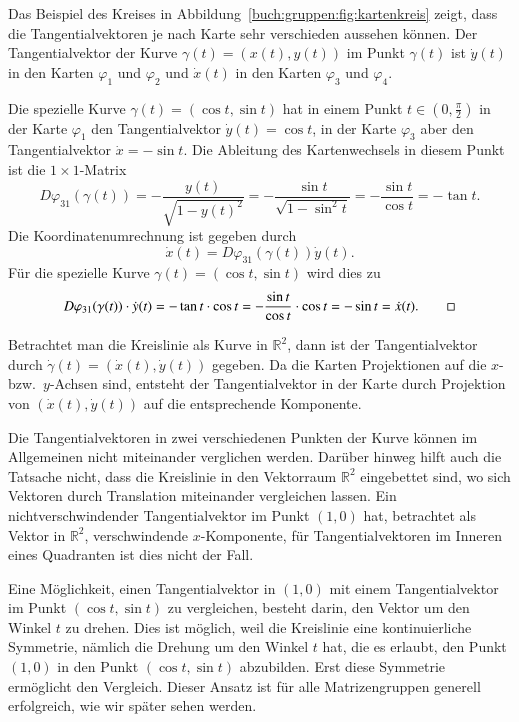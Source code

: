 \begin{beispiel}
Das Beispiel des Kreises in Abbildung~\ref{buch:gruppen:fig:kartenkreis}
zeigt, dass die Tangentialvektoren je nach Karte sehr verschieden
aussehen können.
Der Tangentialvektor der Kurve $\gamma(t) = (x(t), y(t))$ im Punkt
$\gamma(t)$ ist $\dot{y}(t)$ in den Karten $\varphi_1$ und $\varphi_2$ 
und $\dot{x}(t)$ in den Karten $\varphi_3$ und $\varphi_4$.

Die spezielle Kurve $\gamma(t) = (\cos t,\sin t)$ hat in einem Punkt
$t\in (0,\frac{\pi}2)$
in der Karte $\varphi_1$ den Tangentialvektor $\dot{y}(t)=\cos t$,
in der Karte $\varphi_3$ aber den Tangentialvektor $\dot{x}=-\sin t$.
Die Ableitung des Kartenwechsels in diesem Punkt ist die $1\times 1$-Matrix
\[
D\varphi_{31}(\gamma(t))
=
-\frac{y(t)}{\sqrt{1-y(t)^2}}
=
-\frac{\sin t}{\sqrt{1-\sin^2 t}}
=
-\frac{\sin t}{\cos t}
=
-\tan t.
\]
Die Koordinatenumrechnung ist gegeben durch
\[
\dot{x}(t)
=
D\varphi_{31}(\gamma(t)) 
\dot{y}(t).
\]
Für die spezielle Kurve $\gamma(t)=(\cos t,\sin t)$ wird dies zu
\[
D\varphi_{31}(\gamma(t)) 
\cdot
\dot{y}(t)
=
-\tan t\cdot \cos t
=
-\frac{\sin t}{\cos t}\cdot \cos t
=
-\sin t
=
\dot{x}(t).
\qedhere
\]
\end{beispiel}

Betrachtet man die Kreislinie als Kurve in $\mathbb{R}^2$,
dann ist der Tangentialvektor durch
$\dot{\gamma}(t)=(\dot{x}(t),\dot{y}(t))$ gegeben.
Da die Karten Projektionen auf die $x$- bzw.~$y$-Achsen sind,
entsteht der Tangentialvektor in der Karte durch Projektion
von $(\dot{x}(t),\dot{y}(t))$ auf die entsprechende Komponente.

Die Tangentialvektoren in zwei verschiedenen Punkten der Kurve können
im Allgemeinen nicht miteinander verglichen werden.
Darüber hinweg hilft auch die Tatsache nicht, dass die Kreislinie
in den Vektorraum $\mathbb{R}^2$ eingebettet sind, wo sich Vektoren
durch Translation miteinander vergleichen lassen.
Ein nichtverschwindender Tangentialvektor im Punkt $(1,0)$ hat, 
betrachtet als Vektor in $\mathbb{R}^2$, verschwindende $x$-Komponente,
für Tangentialvektoren im Inneren eines Quadranten ist dies nicht
der Fall.

Eine Möglichkeit, einen Tangentialvektor in $(1,0)$ mit einem
Tangentialvektor im Punkt $(\cos t,\sin t)$ zu vergleichen, besteht
darin, den Vektor um den Winkel $t$ zu drehen.
Dies ist möglich, weil die Kreislinie eine kontinuierliche Symmetrie,
nämlich die Drehung um den Winkel $t$ hat, die es erlaubt, den Punkt $(1,0)$
in den Punkt $(\cos t,\sin t)$ abzubilden.
Erst diese Symmetrie ermöglicht den Vergleich.
Dieser Ansatz ist für alle Matrizengruppen generell erfolgreich,
wie wir später sehen werden.

